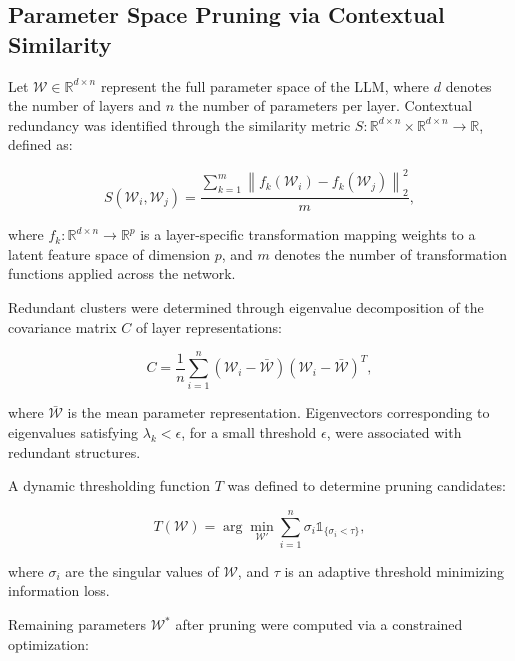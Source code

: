 \documentclass{article}
\begin{document}
\subsection{Parameter Space Pruning via Contextual Similarity}

Let \( \mathcal{W} \in \mathbb{R}^{d \times n} \) represent the full parameter space of the LLM, where \( d \) denotes the number of layers and \( n \) the number of parameters per layer. Contextual redundancy was identified through the similarity metric \( S: \mathbb{R}^{d \times n} \times \mathbb{R}^{d \times n} \to \mathbb{R} \), defined as:

\begin{equation}
	S(\mathcal{W}_i, \mathcal{W}_j) = \frac{\sum_{k=1}^{m} \left\| f_k(\mathcal{W}_i) - f_k(\mathcal{W}_j) \right\|_2^2}{m},
\end{equation}

where \( f_k: \mathbb{R}^{d \times n} \to \mathbb{R}^p \) is a layer-specific transformation mapping weights to a latent feature space of dimension \( p \), and \( m \) denotes the number of transformation functions applied across the network.

Redundant clusters were determined through eigenvalue decomposition of the covariance matrix \( C \) of layer representations:

\begin{equation}
	C = \frac{1}{n} \sum_{i=1}^{n} (\mathcal{W}_i - \bar{\mathcal{W}}) (\mathcal{W}_i - \bar{\mathcal{W}})^T,
\end{equation}

where \( \bar{\mathcal{W}} \) is the mean parameter representation. Eigenvectors corresponding to eigenvalues satisfying \( \lambda_k < \epsilon \), for a small threshold \( \epsilon \), were associated with redundant structures.

A dynamic thresholding function \( T \) was defined to determine pruning candidates:

\begin{equation}
	T(\mathcal{W}) = \arg \min_{\mathcal{W}'} \sum_{i=1}^{n} \sigma_i \mathbb{1}_{\{\sigma_i < \tau\}},
\end{equation}

where \( \sigma_i \) are the singular values of \( \mathcal{W} \), and \( \tau \) is an adaptive threshold minimizing information loss.

Remaining parameters \( \mathcal{W}^{*} \) after pruning were computed via a constrained optimization:
\end{document}
